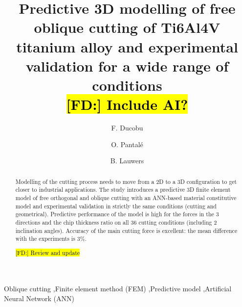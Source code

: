 \documentclass[preprint,12pt,times]{elsarticle}
\DeclareRobustCommand{\FD}[1]{ {\begingroup\sethlcolor{VWgreen}\textcolor{black}{\hl{[FD:] #1}}\endgroup} }
\begin{document}
\begin{frontmatter}

\title{Predictive 3D modelling of free oblique cutting of Ti6Al4V titanium alloy and experimental validation for a wide range of conditions\\ \FD{Include AI?}}

\author[1]{F. Ducobu}

\author[2]{O. Pantal\'{e}}
\author[3]{B. Lauwers}

\address[1]{Machine Design and Production Engineering Lab, Research Institute for Science and Material Engineering, UMONS, Belgium}
\address[2]{Laboratoire G\'{e}nie de Production, INP/ENIT, Universit\'{e} de Toulouse, Tarbes, France}
\address[3]{Department of Mechanical Engineering, KU Leuven \& Flanders Make@KU Leuven-MaPS, Belgium}

\begin{abstract}

Modelling of the cutting process needs to move from a 2D to a 3D configuration to get closer to industrial applications. The study introduces a predictive 3D finite element model of free orthogonal and oblique cutting with an ANN-based material constitutive model and experimental validation in strictly the same conditions (cutting and geometrical). Predictive performance of the model is high for the forces in the 3 directions and the chip thickness ratio on all 36 cutting conditions (including 2 inclination angles). Accuracy of the main cutting force is excellent: the mean difference with the experiments is 3\%.

\FD{Review and update}

\end{abstract}

\begin{keyword}

Oblique cutting \sep Finite element method (FEM) \sep Predictive model \sep Artificial Neural Network (ANN)

\end{keyword}

\end{frontmatter}

\linenumbers
\end{document}
